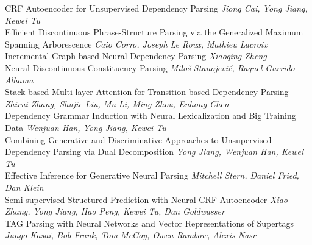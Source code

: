 \documentclass{book}
\begin{document}
    
    \noindent	CRF Autoencoder for Unsupervised Dependency Parsing \newline 
    {\itshape Jiong Cai, Yong Jiang, Kewei Tu} \\
    
    \noindent	Efficient Discontinuous Phrase-Structure Parsing via the Generalized Maximum Spanning Arborescence \newline 
    {\itshape Caio Corro, Joseph Le Roux, Mathieu Lacroix} \\
    
    \noindent	Incremental Graph-based Neural Dependency Parsing \newline 
    {\itshape Xiaoqing Zheng} \\
    
    \noindent	Neural Discontinuous Constituency Parsing \newline 
    {\itshape Miloš Stanojević, Raquel Garrido Alhama} \\
    
    \noindent	Stack-based Multi-layer Attention for Transition-based Dependency Parsing \newline 
    {\itshape Zhirui Zhang, Shujie Liu, Mu Li, Ming Zhou, Enhong Chen} \\
    
    \noindent	Dependency Grammar Induction with Neural Lexicalization and Big Training Data \newline 
    {\itshape Wenjuan Han, Yong Jiang, Kewei Tu} \\
    
    \noindent	Combining Generative and Discriminative Approaches to Unsupervised Dependency Parsing via Dual Decomposition \newline 
    {\itshape Yong Jiang, Wenjuan Han, Kewei Tu} \\
    
    \noindent	Effective Inference for Generative Neural Parsing \newline 
    {\itshape Mitchell Stern, Daniel Fried, Dan Klein} \\
    
    \noindent	Semi-supervised Structured Prediction with Neural CRF Autoencoder \newline 
    {\itshape Xiao Zhang, Yong Jiang, Hao Peng, Kewei Tu, Dan Goldwasser} \\
    
    \noindent	TAG Parsing with Neural Networks and Vector Representations of Supertags \newline 
    {\itshape Jungo Kasai, Bob Frank, Tom McCoy, Owen Rambow, Alexis Nasr} \\
    
\end{document}
